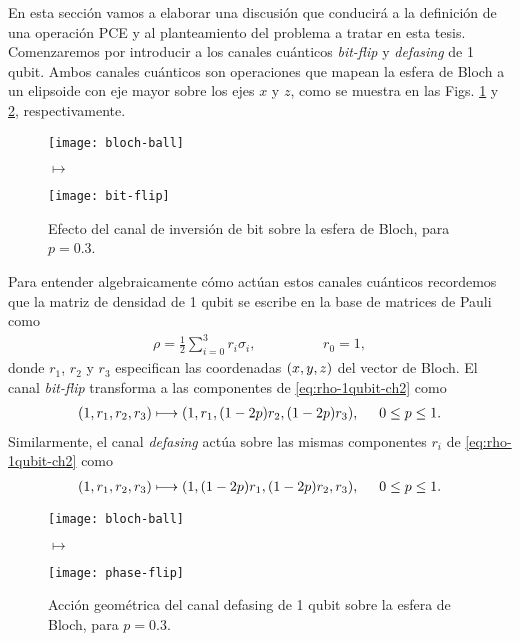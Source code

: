En esta sección vamos a elaborar una discusión que conducirá a
la definición de una operación PCE y al planteamiento del problema
a tratar en esta tesis. 
Comenzaremos por introducir a los canales cuánticos  
\textit{bit-flip} y \textit{defasing} de 1 qubit. 
Ambos canales cuánticos son operaciones que mapean 
la esfera de Bloch a un elipsoide con eje mayor sobre los ejes $x$ y $z$, 
como se muestra en las Figs. \ref{fig:bit-flip} y \ref{fig:phase-flip}, 
respectivamente.
\begin{figure}
\centering
\begin{minipage}{.4\textwidth}
    \centering
    \texttt{[image: bloch-ball]}
\end{minipage}
\LARGE{$\longmapsto$}
\begin{minipage}{0.4\textwidth}
    \centering
    \texttt{[image: bit-flip]}
\end{minipage}
\caption{
Efecto del canal de inversión de bit sobre la esfera de Bloch, para $p=0.3$.}
\label{fig:bit-flip}
\end{figure}
Para entender algebraicamente cómo actúan estos canales cuánticos 
recordemos que la matriz de densidad de 1 qubit se escribe en la 
base de matrices de Pauli como
\begin{align}\label{eq:rho-1qubit-ch2}
\rho=\frac{1}{2}\sum_{i=0}^3r_i\sigma_i,\hspace{2cm}r_0=1,
\end{align}
donde $r_1$, $r_2$ y $r_3$ especifican las coordenadas $\qty(x,y,z)$ 
del vector de Bloch. El canal \textit{bit-flip} transforma a las componentes 
de \eqref{eq:rho-1qubit-ch2} como~\cite{nielsen_chuang_2011}
\begin{align}\label{eq:bit-flip-transformation}
\qty(1,r_1,r_2,r_3)\longmapsto \qty(1,r_1,(1-2p)r_2,(1-2p)r_3),
\hspace{.5cm} 0\leq p\leq 1.
\end{align}
Similarmente, el canal \textit{defasing} actúa sobre las mismas
componentes $r_i$ de \eqref{eq:rho-1qubit-ch2}
como~\cite{nielsen_chuang_2011}
\begin{align}\label{eq:defasing-transformation}
\qty(1,r_1,r_2,r_3)\longmapsto \qty(1,(1-2p)r_1,(1-2p)r_2,r_3),
\hspace{.5cm} 0\leq p\leq 1.
\end{align}
\begin{figure}
\centering
\begin{minipage}{.4\textwidth}
    \centering
    \texttt{[image: bloch-ball]}
\end{minipage}
\LARGE{$\longmapsto$}
\begin{minipage}{0.4\textwidth}
    \centering
    \texttt{[image: phase-flip]}
\end{minipage}
\caption{
Acción geométrica del canal defasing de 1 qubit sobre la 
esfera de Bloch, para $p=0.3$.}
\label{fig:phase-flip}
\end{figure}
